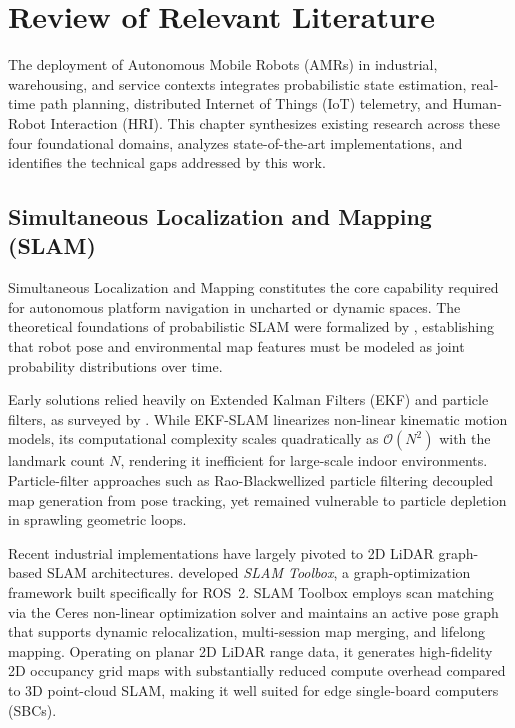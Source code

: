 \chapter{Review of Relevant Literature}
\label{ch:literature_review}

The deployment of Autonomous Mobile Robots (AMRs) in industrial, warehousing, and service contexts integrates probabilistic state estimation, real-time path planning, distributed Internet of Things (IoT) telemetry, and Human-Robot Interaction (HRI). This chapter synthesizes existing research across these four foundational domains, analyzes state-of-the-art implementations, and identifies the technical gaps addressed by this work.

\section{Simultaneous Localization and Mapping (SLAM)}
Simultaneous Localization and Mapping constitutes the core capability required for autonomous platform navigation in uncharted or dynamic spaces. The theoretical foundations of probabilistic SLAM were formalized by \citet{thrun2005probabilistic}, establishing that robot pose and environmental map features must be modeled as joint probability distributions over time. 

Early solutions relied heavily on Extended Kalman Filters (EKF) and particle filters, as surveyed by \citet{bailey2006slam1,bailey2006slam2}. While EKF-SLAM linearizes non-linear kinematic motion models, its computational complexity scales quadratically as $\mathcal{O}(N^2)$ with the landmark count $N$, rendering it inefficient for large-scale indoor environments. Particle-filter approaches such as Rao-Blackwellized particle filtering decoupled map generation from pose tracking, yet remained vulnerable to particle depletion in sprawling geometric loops.

Recent industrial implementations have largely pivoted to 2D LiDAR graph-based SLAM architectures. \citet{macenski2021slam} developed \textit{SLAM Toolbox}, a graph-optimization framework built specifically for ROS~2. SLAM Toolbox employs scan matching via the Ceres non-linear optimization solver and maintains an active pose graph that supports dynamic relocalization, multi-session map merging, and lifelong mapping. Operating on planar 2D LiDAR range data, it generates high-fidelity 2D occupancy grid maps with substantially reduced compute overhead compared to 3D point-cloud SLAM, making it well suited for edge single-board computers (SBCs).

